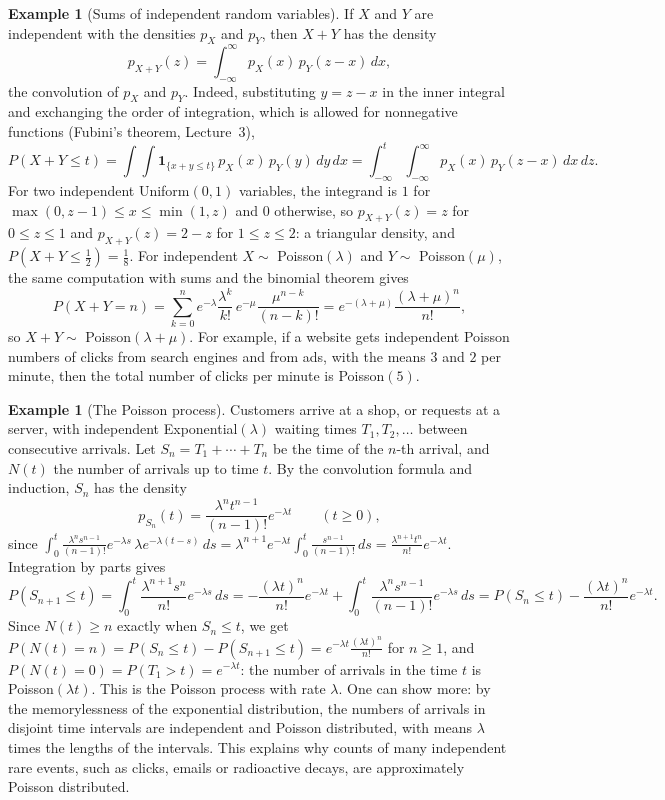 \documentclass[11pt]{article}
\theoremstyle{definition}
\newtheorem{example}[definition]{Example}
\theoremstyle{plain}
\theoremstyle{remark}
\begin{document}
\begin{example}[Sums of independent random variables]\label{ex:convolution}
    If $X$ and $Y$ are independent with the densities $p_X$ and $p_Y$, then $X + Y$ has the density
    \[p_{X+Y}(z) = \int_{-\infty}^\infty p_X(x)\,p_Y(z - x)\, dx,\]
    the convolution of $p_X$ and $p_Y$. Indeed, substituting $y = z - x$ in the inner integral and exchanging the order of integration, which is allowed for nonnegative functions (Fubini's theorem, Lecture~3),
    \[P(X + Y \leq t) = \int\!\!\int \mathbf{1}_{\{x + y \leq t\}}\,p_X(x)\,p_Y(y)\, dy\, dx = \int_{-\infty}^t \int_{-\infty}^\infty p_X(x)\,p_Y(z - x)\, dx\, dz.\]
    For two independent Uniform$(0, 1)$ variables, the integrand is $1$ for $\max(0, z - 1) \leq x \leq \min(1, z)$ and $0$ otherwise, so $p_{X+Y}(z) = z$ for $0 \leq z \leq 1$ and $p_{X+Y}(z) = 2 - z$ for $1 \leq z \leq 2$: a triangular density, and $P(X + Y \leq \frac{1}{2}) = \frac{1}{8}$. For independent $X \sim$ Poisson$(\lambda)$ and $Y \sim$ Poisson$(\mu)$, the same computation with sums and the binomial theorem gives
    \[P(X + Y = n) = \sum_{k=0}^n e^{-\lambda}\frac{\lambda^k}{k!}\,e^{-\mu}\frac{\mu^{n-k}}{(n - k)!} = e^{-(\lambda + \mu)}\frac{(\lambda + \mu)^n}{n!},\]
    so $X + Y \sim$ Poisson$(\lambda + \mu)$. For example, if a website gets independent Poisson numbers of clicks from search engines and from ads, with the means $3$ and $2$ per minute, then the total number of clicks per minute is Poisson$(5)$.
\end{example}

\begin{example}[The Poisson process]\label{ex:poisson-process}
    Customers arrive at a shop, or requests at a server, with independent Exponential$(\lambda)$ waiting times $T_1, T_2, \ldots$ between consecutive arrivals. Let $S_n = T_1 + \cdots + T_n$ be the time of the $n$-th arrival, and $N(t)$ the number of arrivals up to time $t$. By the convolution formula and induction, $S_n$ has the density
    \[p_{S_n}(t) = \frac{\lambda^nt^{n-1}}{(n - 1)!}e^{-\lambda t} \qquad (t \geq 0),\]
    since $\int_0^t \frac{\lambda^ns^{n-1}}{(n - 1)!}e^{-\lambda s}\,\lambda e^{-\lambda(t - s)}\, ds = \lambda^{n+1}e^{-\lambda t}\int_0^t \frac{s^{n-1}}{(n - 1)!}\, ds = \frac{\lambda^{n+1}t^n}{n!}e^{-\lambda t}$. Integration by parts gives
    \[P(S_{n+1} \leq t) = \int_0^t \frac{\lambda^{n+1}s^n}{n!}e^{-\lambda s}\, ds = -\frac{(\lambda t)^n}{n!}e^{-\lambda t} + \int_0^t \frac{\lambda^ns^{n-1}}{(n - 1)!}e^{-\lambda s}\, ds = P(S_n \leq t) - \frac{(\lambda t)^n}{n!}e^{-\lambda t}.\]
    Since $N(t) \geq n$ exactly when $S_n \leq t$, we get $P(N(t) = n) = P(S_n \leq t) - P(S_{n+1} \leq t) = e^{-\lambda t}\frac{(\lambda t)^n}{n!}$ for $n \geq 1$, and $P(N(t) = 0) = P(T_1 > t) = e^{-\lambda t}$: the number of arrivals in the time $t$ is Poisson$(\lambda t)$. This is the Poisson process with rate $\lambda$. One can show more: by the memorylessness of the exponential distribution, the numbers of arrivals in disjoint time intervals are independent and Poisson distributed, with means $\lambda$ times the lengths of the intervals. This explains why counts of many independent rare events, such as clicks, emails or radioactive decays, are approximately Poisson distributed.
\end{example}
\end{document}
